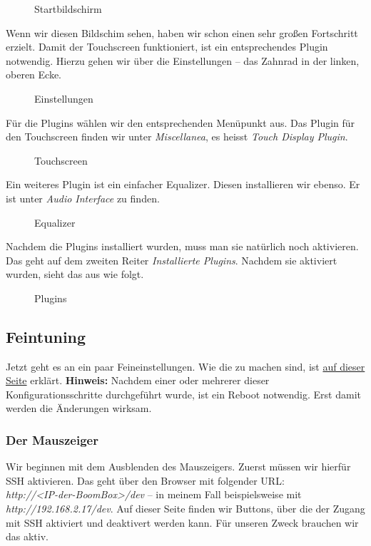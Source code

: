 \documentclass[12pt,a4paper]{article}
\newcommand{\jpaimg}[2]{\begin{figure}[H]\centering\fbox{\texttt{[image: \#1]}}\caption{#2}\label{fig:#2}\end{figure}}
\begin{document}
\jpaimg{./../images/vol-main.png}{Startbildschirm}

Wenn wir diesen Bildschim sehen, haben wir schon einen sehr großen Fortschritt erzielt. Damit der Touchscreen funktioniert, ist ein entsprechendes Plugin
notwendig. Hierzu gehen wir über die Einstellungen -- das Zahnrad in der linken, oberen Ecke.

\jpaimg{./../images/vol-setup.png}{Einstellungen}

Für die Plugins wählen wir den entsprechenden Menüpunkt aus. Das Plugin für den Touchscreen finden wir unter \textit{Miscellanea}, es heisst \textit{Touch
Display Plugin}.

\jpaimg{./../images/vol-touch.png}{Touchscreen}

Ein weiteres Plugin ist ein einfacher Equalizer. Diesen installieren wir ebenso. Er ist unter \textit{Audio Interface} zu finden.

\jpaimg{./../images/vol-equal.png}{Equalizer}

Nachdem die Plugins installiert wurden, muss man sie natürlich noch aktivieren. Das geht auf dem zweiten Reiter \textit{Installierte Plugins}. Nachdem sie
aktiviert wurden, sieht das aus wie folgt.

\jpaimg{./../images/vol-plug-active.png}{Plugins}

\subsection{Feintuning}\label{subsec:Feintuning}
Jetzt geht es an ein paar Feineinstellungen. Wie die zu machen sind, ist \href{https://volumio.org/forum/guide-for-setting-touchscreen-backlight-control-t11425.html}{auf dieser Seite}
erklärt. \textbf{Hinweis:} Nachdem einer oder mehrerer dieser Konfigurationsschritte durchgeführt wurde, ist ein Reboot notwendig. Erst damit werden die
Änderungen wirksam.

\subsubsection{Der Mauszeiger}\label{subsubsec:SSH}
Wir beginnen mit dem Ausblenden des Mauszeigers. Zuerst müssen wir hierfür SSH aktivieren. Das geht über den Browser mit folgender URL:\@ \\
\textit{http://<IP-der-BoomBox>/dev} -- in meinem Fall beispielsweise mit \\ \textit{http://192.168.2.17/dev}. Auf dieser Seite finden wir Buttons, über die der
Zugang mit SSH aktiviert und deaktivert werden kann. Für unseren Zweck brauchen wir das aktiv.
\end{document}
